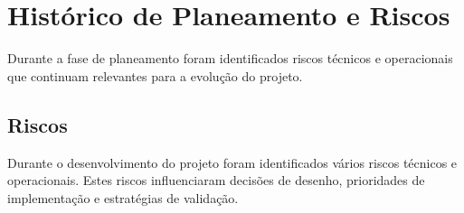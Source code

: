 
    \chapter{Histórico de Planeamento e Riscos}
    \label{chap:historico_planeamento}
    Durante a fase de planeamento foram identificados riscos técnicos e operacionais que continuam relevantes para a evolução do projeto.

    \section{Riscos}

    Durante o desenvolvimento do projeto foram identificados vários riscos técnicos e operacionais. Estes riscos influenciaram decisões de desenho, prioridades de implementação e estratégias de validação.

